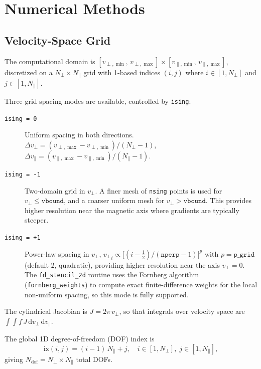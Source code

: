 \documentclass[11pt,a4paper]{article}
\newcommand{\vp}{v_\perp}
\newcommand{\vpa}{v_\parallel}
\newcommand{\vpmin}{v_{\perp,\min}}
\newcommand{\vpmax}{v_{\perp,\max}}
\newcommand{\vpamin}{v_{\parallel,\min}}
\newcommand{\vpamax}{v_{\parallel,\max}}
\begin{document}
\section{Numerical Methods}

\subsection{Velocity-Space Grid}

The computational domain is $[\vpmin,\,\vpmax] \times [\vpamin,\,\vpamax]$,
discretized on a $N_\perp \times N_\parallel$ grid with 1-based indices
$(i,j)$ where $i \in [1,N_\perp]$ and $j \in [1,N_\parallel]$.

Three grid spacing modes are available, controlled by \texttt{ising}:

\begin{description}
  \item[\texttt{ising = 0}] Uniform spacing in both directions.
        $\Delta\vp = (\vpmax-\vpmin)/(N_\perp-1)$,
        $\Delta\vpa = (\vpamax-\vpamin)/(N_\parallel-1)$.

  \item[\texttt{ising = -1}] Two-domain grid in $\vp$.  A finer mesh of
        \texttt{nsing} points is used for $\vp \le \texttt{vbound}$, and a
        coarser uniform mesh for $\vp > \texttt{vbound}$.  This provides
        higher resolution near the magnetic axis where gradients are typically
        steeper.

  \item[\texttt{ising = +1}] Power-law spacing in $\vp$,
        ${\vp}_i \propto \bigl[(i-\tfrac12)/(\texttt{nperp}-1)\bigr]^{p}$ with
        $p = \texttt{p\_grid}$ (default 2, quadratic), providing higher
        resolution near the axis $\vp = 0$.  The \texttt{fd\_stencil\_2d}
        routine uses the Fornberg algorithm (\texttt{fornberg\_weights}) to
        compute exact finite-difference weights for the local non-uniform
        spacing, so this mode is fully supported.
\end{description}

The cylindrical Jacobian is $J = 2\pi\,\vp$, so that integrals over velocity
space are $\int\!\int f\,J\,\mathrm{d}\vp\,\mathrm{d}\vpa$.

The global 1D degree-of-freedom (DOF) index is
\begin{equation}
  \mathrm{ix}(i,j) = (i-1)\,N_\parallel + j,
  \quad i \in [1,N_\perp],\; j \in [1,N_\parallel],
\end{equation}
giving $N_\mathrm{dof} = N_\perp \times N_\parallel$ total DOFs.
\end{document}

